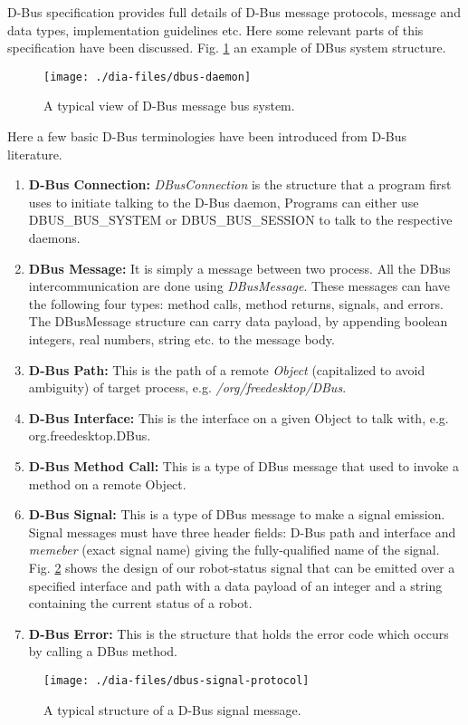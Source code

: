 D-Bus specification \cite{Pennington+2010} provides full details of D-Bus message protocols, message and data types, implementation guidelines etc. Here  some relevant parts of this specification have been discussed. Fig. \ref{fig:dbus-daemon} an example of DBus system structure.
%
\begin{figure}
\begin{center}
\texttt{[image: ./dia-files/dbus-daemon]} 
\caption{A typical view of D-Bus message bus system. } 
\label{fig:dbus-daemon}
\end{center}
\end{figure}
%
Here a few basic D-Bus terminologies have been introduced from D-Bus literature.
\begin{enumerate}
\item \textbf{D-Bus Connection: }
\textit{DBusConnection} is the structure that a program first uses to initiate talking to the D-Bus daemon, Programs can either use\\ DBUS\_BUS\_SYSTEM or DBUS\_BUS\_SESSION to talk to the respective daemons.
\item \textbf{DBus Message: }
It is simply a message between two process. All the DBus intercommunication are done using \textit{DBusMessage}. These messages can have the following four types: method calls, method returns, signals, and errors. The DBusMessage structure can carry data payload, by appending boolean integers, real numbers, string etc. to the message body.
\item \textbf{D-Bus Path: }
This is the path of a remote \textit{Object} (capitalized to avoid ambiguity) of target process, e.g. \textit{/org/freedesktop/DBus}.\\
\item \textbf{D-Bus Interface: }
This is the interface on a given Object to talk with, e.g. org.freedesktop.DBus.
%
\item \textbf{D-Bus Method Call: }
This is a type of DBus message that used to invoke a method on a remote Object.
%
\item \textbf{D-Bus Signal: }
This is a type of DBus message to make a signal emission. Signal messages must have three header fields: D-Bus path and interface and {\em memeber} (exact signal name) giving the fully-qualified name of the signal. Fig. \ref{fig:dbus-signal-protocol}  shows the design of our robot-status signal that can be emitted over a specified interface and path with a data payload of an integer and a string containing the current status of a robot.
%
\item \textbf{D-Bus Error: }
This is the structure that holds the error code which occurs by calling a DBus method.
\end{enumerate}
\begin{figure}
\begin{center}
\texttt{[image: ./dia-files/dbus-signal-protocol]} 
\caption{A typical structure of a D-Bus signal message.} 
\label{fig:dbus-signal-protocol}
\end{center}
\end{figure}
